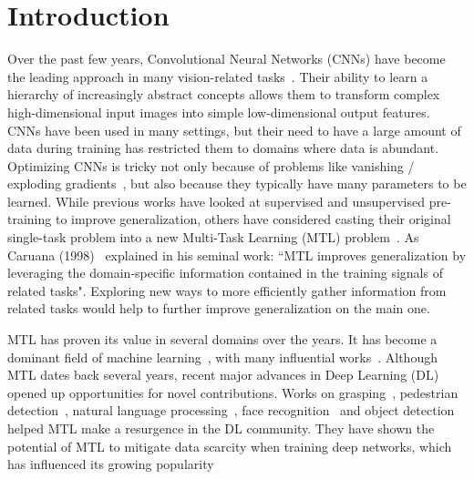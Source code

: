 \documentclass[runningheads]{llncs}
\newcommand{\citep}{\cite}
\newcommand{\citet}{\cite}
\begin{document}
\section{Introduction}
\label{sec:intro}



Over the past few years, Convolutional Neural Networks (CNNs) have become the leading approach in many vision-related tasks~\citep{krizhevsky2012imagenet}. Their ability to learn a hierarchy of increasingly abstract concepts allows them to transform complex high-dimensional input images into simple low-dimensional output features. CNNs have been used in many settings, but their need to have a large amount of data during training has restricted them to domains where data is abundant. Optimizing CNNs is tricky not only because of problems like vanishing / exploding gradients~\citep{hochreiter1998vanishing}, but also because they typically have many parameters to be learned. While previous works have looked at supervised and unsupervised pre-training to improve generalization, others have considered casting their original single-task problem into a new Multi-Task Learning (MTL) problem~\citet{zhang2017survey}. As Caruana (1998)~\citet{caruana1998multitask} explained in his seminal work: ``MTL improves generalization by leveraging the domain-specific information contained in the training signals of related tasks". Exploring new ways to more efficiently gather information from related tasks would help to further improve generalization on the main one.


MTL has proven its value in several domains over the years. It has become a dominant field of machine learning~\citep{zhang2014review}, with many influential works~\citep{evgeniou2004regularized}. Although MTL dates back several years, recent major advances in Deep Learning (DL) opened up opportunities for novel contributions. Works on grasping~\citep{pinto2017learning}, pedestrian detection~\citep{tian2015pedestrian}, natural language processing~\citep{liu2015representation}, face recognition~\citep{yim2015rotating}\citep{yin2017multi} and object detection~\citep{misra2016cross} helped MTL make a resurgence in the DL community. They have shown the potential of MTL to mitigate data scarcity when training deep networks, which has influenced its growing popularity
\end{document}
